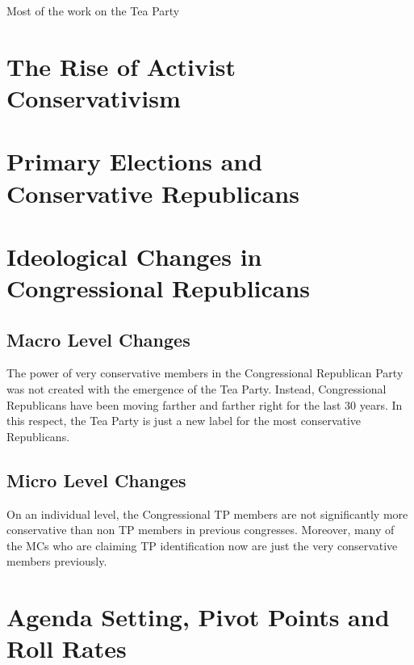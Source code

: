 \documentclass[12pt]{article}
\begin{document}
Most of the work on the Tea Party

\section{The Rise of Activist Conservativism}


\section{Primary Elections and Conservative Republicans}

\section{Ideological Changes in Congressional Republicans}
\subsection{Macro Level Changes}
The power of very conservative members in the Congressional Republican Party was not created with the emergence of the Tea Party. Instead, Congressional Republicans have been moving farther and farther right for the last 30 years. In this respect, the Tea Party is just a new label for the most conservative Republicans.

\subsection{Micro Level Changes}
On an individual level, the Congressional TP members are not significantly more conservative than non TP members in previous congresses. Moreover, many of the MCs who are claiming TP identification now are just the very conservative members previously.

\section{Agenda Setting, Pivot Points and Roll Rates}
\end{document}
